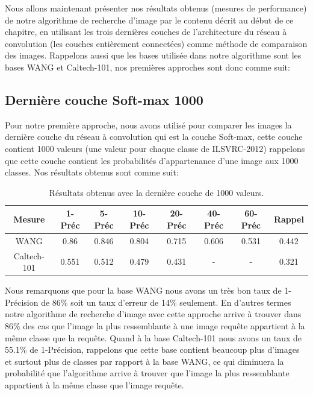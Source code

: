 	Nous allons maintenant présenter nos résultats obtenus (mesures de performance) de notre algorithme de recherche d'image par le contenu décrit au début de ce chapitre, en utilisant les trois dernières couches de l'architecture du réseau à convolution (les couches entièrement connectées) comme méthode de comparaison des images. Rappelons aussi que les bases utilisée dans notre algorithme sont les bases WANG et Caltech-101, nos premières approches sont donc comme suit:

\subsection{Dernière couche Soft-max 1000}
	Pour notre première approche, nous avons utilisé pour comparer les images la dernière couche du réseau à convolution qui est la couche Soft-max, cette couche contient 1000 valeurs (une valeur pour chaque classe de ILSVRC-2012) rappelons que cette couche contient les probabilités d'appartenance d'une image aux 1000 classes. Nos résultats obtenus sont comme suit:	

\begin{table}[H]
\begin{center}
\begin{tabular}{|c|c|c|c|c|c|c|c|}
\hline
	Mesure & 1-Préc & 5-Préc & 10-Préc & 20-Préc & 40-Préc & 60-Préc & Rappel\\
\hline
	WANG & 0.86 & 0.846 & 0.804 & 0.715 & 0.606 & 0.531 & 0.442\\
\hline
	Caltech-101 & 0.551 & 0.512 & 0.479 & 0.431 & - & - & 0.321\\
\hline
\end{tabular}
\end{center}
\caption{Résultats obtenus avec la dernière couche de 1000 valeurs.}
\end{table}

	Nous remarquons que pour la base WANG nous avons un très bon taux de 1-Précision de 86\% soit un taux d'erreur de 14\% seulement. En d'autres termes notre algorithme de recherche d'image avec cette approche arrive à trouver dans 86\% des cas que l'image la plus ressemblante à une image requête appartient à la même classe que la requête. Quand à la base Caltech-101 nous avons un taux de 55.1\% de 1-Précision, rappelons que cette base contient beaucoup plus d'images et surtout plus de classes par rapport à la base WANG, ce qui diminuera la probabilité que l'algorithme arrive à trouver que l'image la plus ressemblante appartient à la même classe que l'image requête.
	
